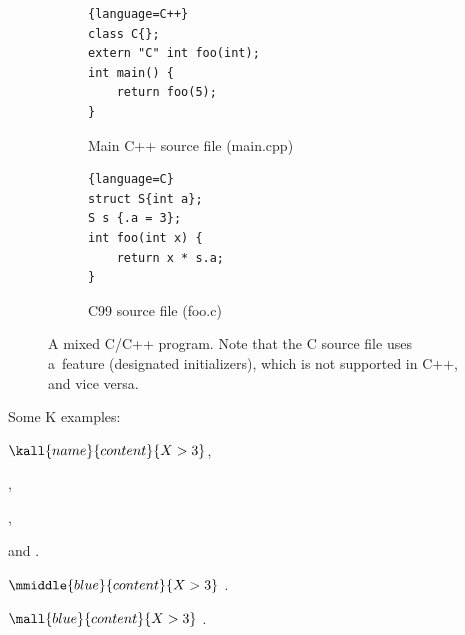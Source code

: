 \documentclass[nolot,nolof,nocover,printed]{fithesis3}
\begin{document}
\begin{figure}
\centering
\begin{subfigure}{.5\textwidth}
  \centering

\begin{lstlisting}{language=C++}
class C{};
extern "C" int foo(int);
int main() {
	return foo(5);
}
\end{lstlisting}

  \caption{Main C++ source file (main.cpp)}
\end{subfigure}%
\begin{subfigure}{.5\textwidth}
  \centering
\begin{lstlisting}{language=C}
struct S{int a};
S s {.a = 3};
int foo(int x) {
	return x * s.a;
}
\end{lstlisting}
  \caption{C99 source file (foo.c)}
\end{subfigure}
\caption{A mixed C/C++ program. Note that the C source file uses a~feature (designated initializers), which is not supported in C++, and vice versa.}
\label{fig:cpp-program-example}
\end{figure}


\ifshowkexamples
Some K examples:

$\kall{name}{content}{X > 3}$,

,

,

and .

$\mmiddle{blue}{content}{X > 3}$
.

$\mall{blue}{content}{X > 3}$
.


\fi %

\fi %


 
\end{document}
